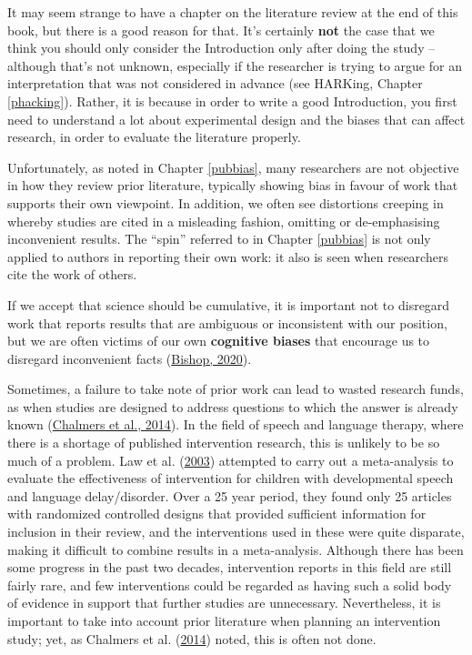 \documentclass{krantz}
\begin{document}
It may seem strange to have a chapter on the literature review at the end of this book, but there is a good reason for that. It's certainly \textbf{not} the case that we think you should only consider the Introduction only after doing the study -- although that's not unknown, especially if the researcher is trying to argue for an interpretation that was not considered in advance (see HARKing, Chapter \ref{phacking}). Rather, it is because in order to write a good Introduction, you first need to understand a lot about experimental design and the biases that can affect research, in order to evaluate the literature properly.

Unfortunately, as noted in Chapter \ref{pubbias}, many researchers are not objective in how they review prior literature, typically showing bias in favour of work that supports their own viewpoint. In addition, we often see distortions creeping in whereby studies are cited in a misleading fashion, omitting or de-emphasising inconvenient results. The ``spin'' referred to in Chapter \ref{pubbias} is not only applied to authors in reporting their own work: it also is seen when researchers cite the work of others.

If we accept that science should be cumulative, it is important not to disregard work that reports results that are ambiguous or inconsistent with our position, but we are often victims of our own \textbf{cognitive biases} that encourage us to disregard inconvenient facts (\protect\hyperlink{ref-bishop2020}{Bishop, 2020}).

Sometimes, a failure to take note of prior work can lead to wasted research funds, as when studies are designed to address questions to which the answer is already known (\protect\hyperlink{ref-chalmers2014}{Chalmers et al., 2014}). In the field of speech and language therapy, where there is a shortage of published intervention research, this is unlikely to be so much of a problem. Law et al. (\protect\hyperlink{ref-law2003}{2003}) attempted to carry out a meta-analysis to evaluate the effectiveness of intervention for children with developmental speech and language delay/disorder. Over a 25 year period, they found only 25 articles with randomized controlled designs that provided sufficient information for inclusion in their review, and the interventions used in these were quite disparate, making it difficult to combine results in a meta-analysis. Although there has been some progress in the past two decades, intervention reports in this field are still fairly rare, and few interventions could be regarded as having such a solid body of evidence in support that further studies are unnecessary. Nevertheless, it is important to take into account prior literature when planning an intervention study; yet, as Chalmers et al. (\protect\hyperlink{ref-chalmers2014}{2014}) noted, this is often not done.
\end{document}
